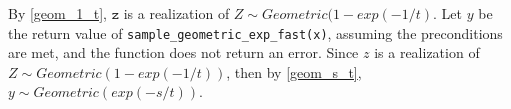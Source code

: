 \documentclass{article}
\begin{document}
By \ref{geom_1_t}, $\mathtt{z}$ is a realization of $Z \sim Geometric(1 - exp(-1/t)$.
Let $y$ be the return value of \texttt{sample\_geometric\_exp\_fast(x)}, assuming the preconditions are met, and the function does not return an error.
Since $z$ is a realization of $Z \sim Geometric(1 - exp(-1/t))$, then by \ref{geom_s_t}, $y \sim Geometric(exp(-s/t))$.



\end{document}
